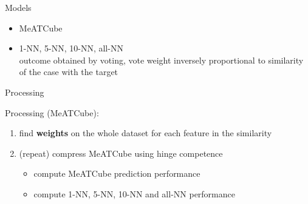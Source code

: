 \documentclass[]{beamer}
\begin{document}





\begin{frame}{Models}

    
    \begin{itemize}
        \item MeATCube
        \item 1-NN, 5-NN, 10-NN, all-NN\\
        outcome obtained by voting, vote weight inversely proportional to similarity of the case with the target\\
    \end{itemize}

\end{frame}
\begin{frame}{Processing}

    Processing (MeATCube):
    \begin{enumerate}
        \item find \textbf{weights} on the whole dataset for each feature in the similarity
        \item (repeat) compress MeATCube using hinge competence
        \begin{itemize}
            \item compute MeATCube prediction performance
            \item compute 1-NN, 5-NN, 10-NN and all-NN performance
        \end{itemize}
    \end{enumerate}

\end{frame}

        
\end{document}
